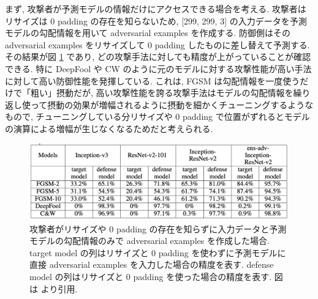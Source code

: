 まず, 攻撃者が予測モデルの情報だけにアクセスできる場合を考える.
攻撃者はリサイズは 0 padding の存在を知らないため, [299, 299, 3] の入力データを予測モデルの勾配情報を用いて adversarial examples を作成する.
防御側はその adversarial examples をリサイズして 0 padding したものに差し替えて予測する.
その結果が図 \ref{fig:mitigating-adversarial-vanilla} であり, どの攻撃手法に対しても精度が上がっていることが確認できる.
特に DeepFool や CW のように元のモデルに対する攻撃性能が高い手法に対して高い防御性能を発揮している.
これは, FGSM は勾配情報を一度使うだけで「粗い」摂動だが, 高い攻撃性能を誇る攻撃手法はモデルの勾配情報を繰り返し使って摂動の効果が増幅されるように摂動を細かくチューニングするようなもので, チューニングしている分リサイズや 0 padding で位置がずれるとモデルの演算による増幅が生じなくなるためだと考えられる.
%
\begin{figure}[htbp]
\begin{center}
\includegraphics[width=14.0cm]{figures/mitigating-adversarial-vanilla.pdf}
\end{center}
\caption{
攻撃者がリサイズや 0 padding の存在を知らずに入力データと予測モデルの勾配情報のみで adversarial examples を作成した場合.
target model の列はリサイズと 0 padding を使わずに予測モデルに直接 adversarial examples を入力した場合の精度を表す.
defense model の列はリサイズと 0 padding を使った場合の精度を表す.
図は \cite{xie2017mitigating} より引用.
}
\label{fig:mitigating-adversarial-vanilla}
\end{figure}
%

